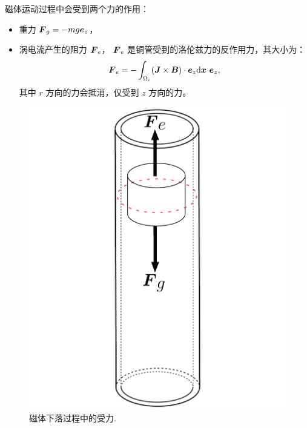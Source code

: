 \documentclass[notheorems,serif]{beamer}
\begin{document}
\begin{frame}
\end{frame}

\begin{frame}
\begin{minipage}[b]{0.55\linewidth}
磁体运动过程中会受到两个力的作用：
\begin{itemize}
    \item 重力 $\boldsymbol{F}_g = -mg\boldsymbol{e}_z$，
    \item 涡电流产生的阻力 $\boldsymbol{F}_e$，
        $\boldsymbol{F}_{e}$ 是铜管受到的洛伦兹力的反作用力，其大小为：
    \begin{equation}
    \label{eddy_current_force}
    \boldsymbol{F}_{e} = -\int_{\Omega_c} (\boldsymbol{J} \times \boldsymbol{B})\cdot\boldsymbol{e}_z \mathrm{d} \boldsymbol{x}\ \boldsymbol{e}_z,
    \end{equation}
    其中 $r$ 方向的力会抵消，仅受到 $z$ 方向的力。
\end{itemize}
\vspace{20pt}
\end{minipage}
\vspace{10pt}
\begin{minipage}[b]{0.38\linewidth}
    \centering
    \begin{figure}[htpb]
        \centering
        \includegraphics[width=1.0\textwidth]{../figures/movingmaxwell/magnet_falling_force.pdf}
        \caption{磁体下落过程中的受力.}
    \end{figure}
\end{minipage}
\end{frame}
\end{document}
